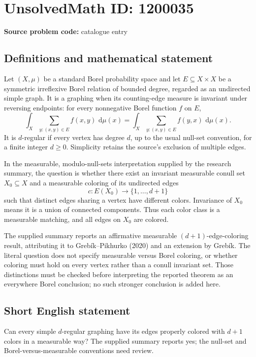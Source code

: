 \documentclass[11pt]{article}
\newcommand{\dd}{\,\mathrm{d}}
\begin{document}
\section*{UnsolvedMath ID: 1200035}
\textbf{Source problem code:} catalogue entry
\subsection{Definitions and mathematical statement}
Let \((X,\mu)\) be a standard Borel probability space and let \(E\subseteq X\times X\) be a symmetric irreflexive Borel relation of bounded degree, regarded as an undirected simple graph. It is a graphing when its counting-edge measure is invariant under reversing endpoints: for every nonnegative Borel function \(f\) on \(E\),
\[
\int_X\sum_{y:(x,y)\in E}f(x,y)\,\dd\mu(x)
=
\int_X\sum_{y:(x,y)\in E}f(y,x)\,\dd\mu(x).
\]
It is \(d\)-regular if every vertex has degree \(d\), up to the usual null-set convention, for a finite integer \(d\ge0\). Simplicity retains the source's exclusion of multiple edges.

In the measurable, modulo-null-sets interpretation supplied by the research summary, the question is whether there exist an invariant measurable conull set \(X_0\subseteq X\) and a measurable coloring of its undirected edges
\[
c:E(X_0)\longrightarrow\{1,\ldots,d+1\}
\]
such that distinct edges sharing a vertex have different colors. Invariance of \(X_0\) means it is a union of connected components. Thus each color class is a measurable matching, and all edges on \(X_0\) are colored.

The supplied summary reports an affirmative measurable \((d+1)\)-edge-coloring result, attributing it to Greb\'ik--Pikhurko (2020) and an extension by Greb\'ik. The literal question does not specify measurable versus Borel coloring, or whether coloring must hold on every vertex rather than a conull invariant set. Those distinctions must be checked before interpreting the reported theorem as an everywhere Borel conclusion; no such stronger conclusion is added here.
\subsection{Short English statement}
Can every simple \(d\)-regular graphing have its edges properly colored with \(d+1\) colors in a measurable way? The supplied summary reports yes; the null-set and Borel-versus-measurable conventions need review.
\end{document}
